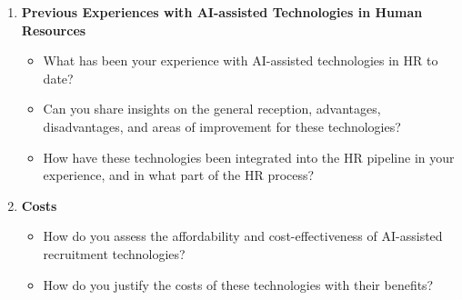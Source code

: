\documentclass[draft,final]{thesisclass} %
\begin{document}
\begin{enumerate}
\begin{itemize}
    \end{itemize}
    \item \textbf{Previous Experiences with \acs{AI}-assisted Technologies in Human Resources}
    \begin{itemize}
        \item What has been your experience with \acs{AI}-assisted technologies in \acs{HR} to date?
        \item Can you share insights on the general reception, advantages, disadvantages, and areas of improvement for these technologies?
        \item How have these technologies been integrated into the \acs{HR} pipeline in your experience, and in what part of the \acs{HR} process?
    \end{itemize}
    \item \textbf{Costs}
    \begin{itemize}
        \item How do you assess the affordability and cost-effectiveness of \acs{AI}-assisted recruitment technologies?
        \item How do you justify the costs of these technologies with their benefits?
    \end{itemize}
\end{enumerate}
\end{document}
